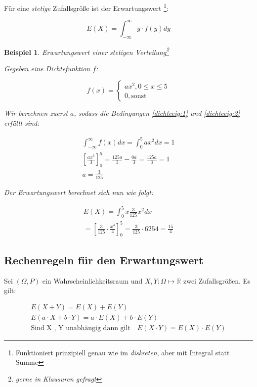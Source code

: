 \documentclass{tufte-handout}
\theoremstyle{own}
\newtheorem{example}{Beispiel}[]
\begin{document}
Für eine \textit{stetige} Zufallsgröße ist der Erwartungswert
\footnote{Funktioniert prinzipiell genau wie im \textit{diskreten}, aber mit Integral statt Summe}:

\begin{equation}
E(X) = \int_{-\infty}^{\infty} y \cdot f(y) dy
\end{equation}

\begin{example}\label{bsp:erwartungswertstetig}
Erwartungswert einer stetigen Verteilung\footnote{gerne in Klausuren gefragt}

Gegeben eine Dichtefunktion $f$:

\begin{equation*}
	f(x) = \begin{cases} 
	ax^2, 0 \leq x \leq 5 \\
	0, \text{sonst}
	\end{cases}
\end{equation*}

Wir berechnen zuerst $a$, sodass die Bedingungen \eqref{dichteeig:1} und
\eqref{dichteeig:2} erfüllt sind:

\begin{gather*}
\int_{-\infty}^{\infty} f(x)dx = \int_0^5 ax^2 dx = 1 \\
[\frac{a x^3}{3}]_0^5 = \frac{125a}{3} - \frac{0a}{3} =  \frac{125a}{3} = 1 \\
a = \frac{3}{125}
\end{gather*}

Der Erwartungswert berechnet sich nun wie folgt:

\begin{gather*}
E(X) = \int_0^5 x \frac{3}{125} x^2 dx \\
= [\frac{3}{125} \cdot \frac{x^4}{4}]_0^5 = \frac{3}{125} \cdot {625}{4} = \frac{15}{4}
\end{gather*}

\end{example}

\subsection{Rechenregeln für den Erwartungswert}

Sei $(\Omega, P)$ ein Wahrscheinlichkeitsraum und $X,Y : \Omega \mapsto \mathbb{R}$ zwei Zufallsgrößen. Es gilt:

\begin{gather}
E(X + Y) = E(X) + E(Y) \\
E( a \cdot X + b \cdot Y) = a \cdot E(X) + b \cdot E(Y)  \\
\text{Sind X , Y unabhängig dann gilt} \hspace{1em} E (X \cdot Y ) = E ( X )\cdot E ( Y )
\end{gather}
\end{document}
